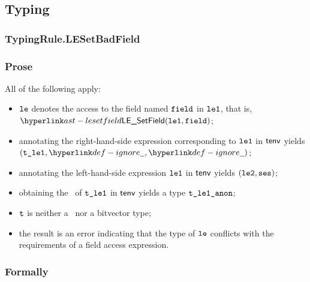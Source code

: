 \subsection{Typing}
\subsubsection{TypingRule.LESetBadField\label{sec:TypingRule.LESetBadField}}
\subsubsection{Prose}
All of the following apply:
\begin{itemize}
  \item $\vle$ denotes the access to the field named $\field$ in $\vleone$, that is, \\ $\LESetField(\vleone, \field)$;
  \item annotating the right-hand-side expression corresponding to $\vleone$ in $\tenv$ yields \\ $(\vtleone, \Ignore, \Ignore)$\ProseOrTypeError;
  \item annotating the left-hand-side expression $\vleone$ in $\tenv$ yields $(\vletwo, \vses)$\ProseOrTypeError;
  \item obtaining the \underlyingtype\ of $\vtleone$ in $\tenv$ yields a type $\tleoneanon$\ProseOrTypeError;
  \item $\vt$ is neither a \structuredtype\ nor a bitvector type;
  \item the result is an error indicating that the type of $\vle$ conflicts with the requirements of a field access expression.
\end{itemize}
\subsubsection{Formally}
\begin{mathpar}
\end{mathpar}

